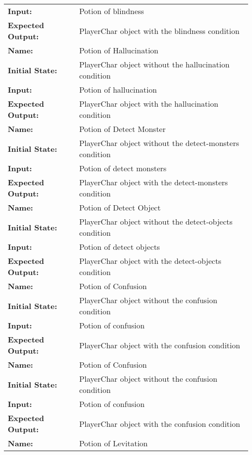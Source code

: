 \documentclass[12pt, titlepage]{article}
\begin{document}
\begin{center}
\begin{longtable}{ l | p{10cm} }
				\textbf{Input:} & Potion of blindness\\
				\textbf{Expected Output:} & PlayerChar object with the blindness condition\\[0.6em]
				\hline
				\rule{0pt}{1.5em}\textbf{Name:} & Potion of Hallucination\\
				\textbf{Initial State:} & PlayerChar object without the hallucination condition\\
				\textbf{Input:} & Potion of hallucination\\
				\textbf{Expected Output:} & PlayerChar object with the hallucination condition\\[0.6em]
				\hline
				\rule{0pt}{1.5em}\textbf{Name:} & Potion of Detect Monster\\
				\textbf{Initial State:} & PlayerChar object without the detect-monsters condition\\
				\textbf{Input:} & Potion of detect monsters\\
				\textbf{Expected Output:} & PlayerChar object with the detect-monsters condition\\[0.6em]
				\hline
				\rule{0pt}{1.5em}\textbf{Name:} & Potion of Detect Object\\
				\textbf{Initial State:} & PlayerChar object without the detect-objects condition\\
				\textbf{Input:} & Potion of detect objects\\
				\textbf{Expected Output:} & PlayerChar object with the detect-objects condition\\[0.6em]
				\hline
				\rule{0pt}{1.5em}\textbf{Name:} & Potion of Confusion\\
				\textbf{Initial State:} & PlayerChar object without the confusion condition\\
				\textbf{Input:} & Potion of confusion\\
				\textbf{Expected Output:} & PlayerChar object with the confusion condition\\[0.6em]
				\hline
				\rule{0pt}{1.5em}\textbf{Name:} & Potion of Confusion\\
				\textbf{Initial State:} & PlayerChar object without the confusion condition\\
				\textbf{Input:} & Potion of confusion\\
				\textbf{Expected Output:} & PlayerChar object with the confusion condition\\[0.6em]
				\hline
				\rule{0pt}{1.5em}\textbf{Name:} & Potion of Levitation\\

\end{longtable}
\end{center}
\end{document}

